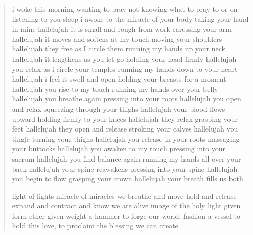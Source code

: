 \begin{verse}
i woke this morning wanting to pray
not knowing what to pray to or on
listening to you sleep i awoke to
the miracle of your body
taking your hand in mine
hallelujah it is small and rough from work
caressing your arm
hallelujah it moves and softens at my touch
moving your shoulders
hallelujah they free as I circle them
running my hands up your neck
hallelujah it lengthens as you let go
holding your head firmly 
hallelujah you relax as i circle your temples
running my hands down to your heart
hallelujah i feel it swell and open
holding your breasts for a moment
hallelujah you rise to my touch
running my hands over your belly
hallelujah you breathe again
pressing into your roots
hallelujah you open and relax
squeezing through your thighs 
hallelujah your blood flows upward
holding firmly to your knees 
hallelujah they relax
grasping your feet
hallelujah they open and release
stroking your calves 
hallelujah you tingle
turning your thighs 
hallelujah you release in your roots
massaging your buttocks
hallelujah you awaken to my touch
pressing into your sacrum
hallelujah you find balance again
running my hands all over your back
hallelujah your spine reawakens
pressing into your spine
hallelujah you begin to flow
grasping your crown
hallelujah your breath fills us both

light of lights
miracle of miracles
we breathe and move
hold and release
expand and contract
and know we are alive
image of the holy 
light given form
ether given weight
a hammer to forge our world,
fashion a vessel to hold this love,
to proclaim the blessing we can create

\end{verse}
